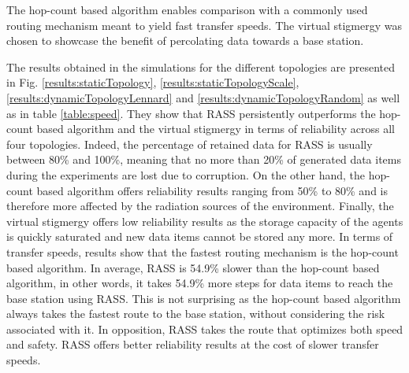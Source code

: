 The hop-count based algorithm enables comparison with a commonly used routing mechanism meant to yield fast transfer speeds. The virtual stigmergy was chosen to showcase the benefit of percolating data towards a base station.

The results obtained in the simulations for the different topologies are presented in Fig. \ref{results:staticTopology}, \ref{results:staticTopologyScale}, \ref{results:dynamicTopologyLennard} and \ref{results:dynamicTopologyRandom} as well as in table \ref{table:speed}. They show that RASS persistently outperforms the hop-count based algorithm and the virtual stigmergy in terms of reliability across all four topologies. Indeed, the percentage of retained data for RASS is usually between 80\% and 100\%, meaning that no more than 20\% of generated data items during the experiments are lost due to corruption. On the other hand, the hop-count based algorithm offers reliability results ranging from 50\% to 80\% and is therefore more affected by the radiation sources of the environment. Finally, the virtual stigmergy offers low reliability results as the storage capacity of the agents is quickly saturated and new data items cannot be stored any more. In terms of transfer speeds, results show that the fastest routing mechanism is the hop-count based algorithm. In average, RASS is 54.9\% slower than the hop-count based algorithm, in other words, it takes 54.9\% more steps for data items to reach the base station using RASS. This is not surprising as the hop-count based algorithm always takes the fastest route to the base station, without considering the risk associated with it. In opposition, RASS takes the route that optimizes both speed and safety. RASS offers better reliability results at the cost of slower transfer speeds.  

